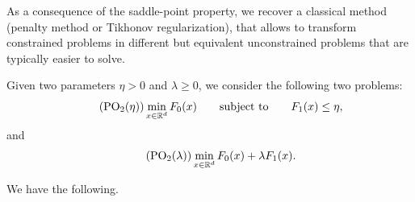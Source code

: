      As a consequence of the saddle-point property, we recover a classical method (penalty method or Tikhonov regularization), that allows to transform constrained problems in different but equivalent unconstrained problems that are typically easier to solve.
 
     Given two parameters $\eta> 0$ and $\lambda \ge 0$, we consider the following two problems:
     \begin{equation}
         \label{eq:op-eta}
         \tag{PO$_2$($\eta$)}
         \min_{x\in\mathbb{R}^d}F_0(x)
         \qquad\text{subject to}\qquad
         F_1(x)\le \eta,
     \end{equation}
     and
     \begin{equation}
         \label{eq:op-lambda}
         \tag{PO$_2$($\lambda$)}
         \min_{x\in\mathbb{R}^d}F_0(x) + \lambda F_1(x).
     \end{equation}
 
     We have the following.
 
 

